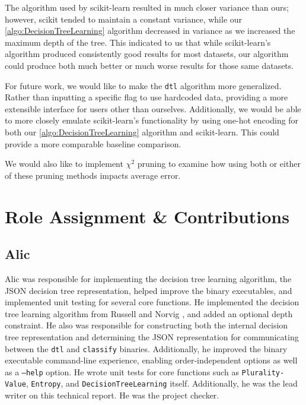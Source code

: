 \documentclass[screen, authorversion, nonacm, sigconf]{acmart}
\begin{document}
The algorithm used by scikit-learn resulted in much closer variance than ours; however, scikit tended to maintain a constant variance, while our \ref{algo:DecisionTreeLearning} algorithm decreased in variance as we increased the maximum depth of the tree. This indicated to us that while scikit-learn's algorithm produced consistently good results for most datasets, our algorithm could produce both much better or much worse results for those same datasets.

For future work, we would like to make the \texttt{dtl} algorithm more generalized. Rather than inputting a specific flag to use hardcoded data, providing a more extensible interface for users other than ourselves. Additionally, we would be able to more closely emulate scikit-learn's functionality by using one-hot encoding for both our \ref{algo:DecisionTreeLearning} algorithm and scikit-learn. This could provide a more comparable baseline comparison.

We would also like to implement $\chi^2$ pruning to examine how using both or either of these pruning methods impacts average error.

\section{Role Assignment \& Contributions}

\subsection{Alic}

Alic was responsible for implementing the decision tree learning algorithm, the JSON decision tree representation, helped improve the binary executables, and implemented unit testing for several core functions. He implemented the decision tree learning algorithm from Russell and Norvig \cite{russell_norvig_2010}, and added an optional depth constraint. He also was responsible for constructing both the internal decision tree representation and determining the JSON representation for communicating between the \texttt{dtl} and \texttt{classify} binaries. Additionally, he improved the binary executable command-line experience, enabling order-independent options as well as a \texttt{--help} option. He wrote unit tests for core functions such as \texttt{Plurality-Value}, \texttt{Entropy}, and \texttt{DecisionTreeLearning} itself. Additionally, he was the lead writer on this technical report. He was the project checker.
\end{document}

